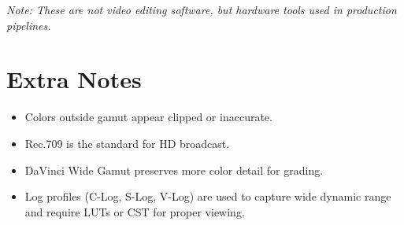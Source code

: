 \documentclass[12pt,a4paper]{article}
\begin{document}
\textit{Note: These are not video editing software, but hardware tools used in production pipelines.}

\section{Extra Notes}
\begin{itemize}
    \item Colors outside gamut appear clipped or inaccurate.
    \item Rec.709 is the standard for HD broadcast.
    \item DaVinci Wide Gamut preserves more color detail for grading.
    \item Log profiles (C-Log, S-Log, V-Log) are used to capture wide dynamic range and require LUTs or CST for proper viewing.
\end{itemize}
\end{document}
